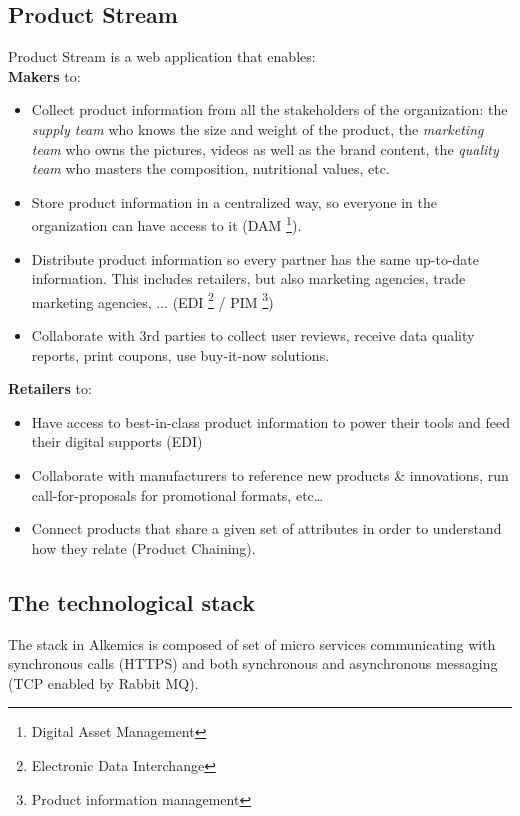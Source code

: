 \subsection{Product Stream}

Product Stream is a web application that enables:
\\

\textbf{Makers} to:
    \begin{itemize}
    \item Collect product information from all the stakeholders of the organization: the \textit{supply team} who knows the size and weight of the product, the \textit{marketing team} who owns the pictures, videos as well as the brand content, the \textit{quality team} who masters the composition, nutritional values, etc.
    \item Store product information in a centralized way, so everyone in the organization can have access to it (DAM \footnote{Digital Asset Management}).
    \item Distribute product information so every partner has the same up-to-date information. This includes retailers, but also marketing agencies, trade marketing agencies, ... (EDI \footnote{Electronic Data Interchange} / PIM \footnote{Product information management})
    \item Collaborate with 3rd parties to collect user reviews,  receive data quality reports,  print coupons, use buy-it-now solutions.
    \end{itemize}

\textbf{Retailers} to:
    \begin{itemize}
    \item Have access to best-in-class product information to power their tools and feed their digital supports (EDI)
    \item Collaborate with manufacturers to reference new products \& innovations, run call-for-proposals for promotional formats, etc…
    \item Connect products that share a given set of attributes in order to understand how they relate (Product Chaining).
    \end{itemize}

\subsection{The technological stack}

The stack in Alkemics is composed of set of micro services communicating with synchronous calls (HTTPS) and both synchronous and asynchronous messaging (TCP enabled by Rabbit MQ).

